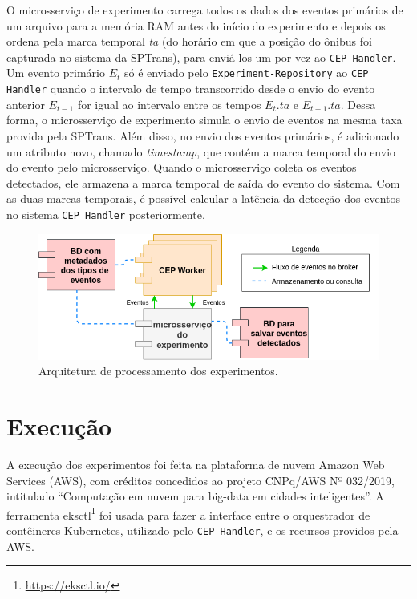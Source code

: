 O microsserviço de experimento carrega todos os dados dos eventos primários de um arquivo para a memória RAM antes do início do experimento e depois os ordena pela marca temporal \textit{ta} (do horário em que a posição do ônibus foi capturada no sistema da SPTrans), para enviá-los um por vez ao \texttt{CEP Handler}. Um evento primário $E_t$ só é enviado pelo \texttt{Experiment-Repository} ao \texttt{CEP Handler} quando o intervalo de tempo transcorrido desde o envio do evento anterior $E_{t-1}$ for igual ao intervalo entre os tempos $E_t.ta$ e $E_{t-1}.ta$. 
Dessa forma, o microsserviço de experimento simula o envio de eventos na mesma taxa provida pela SPTrans. 
Além disso, no envio dos eventos primários, é adicionado um atributo novo, chamado \textit{timestamp}, que contém a marca temporal do envio do evento pelo microsserviço. Quando o microsserviço coleta os eventos detectados, ele armazena a marca temporal de saída do evento do sistema. Com as duas marcas temporais, é possível calcular a latência da detecção dos eventos no sistema \texttt{CEP Handler} posteriormente.  



\begin{figure}[tb]
\centering
\includegraphics[width=\textwidth]{figuras/arquiteturaexp.png}
\caption{Arquitetura de processamento dos experimentos.}
\label{fig:experiment_arch_diagram}
\end{figure}

\section{Execução} 
A execução dos experimentos foi feita na plataforma de nuvem Amazon Web Services (AWS), com créditos concedidos ao projeto CNPq/AWS Nº 032/2019, intitulado ``Computação em nuvem para big-data em cidades inteligentes''.
A ferramenta eksctl\footnote{\url{https://eksctl.io/}} foi usada para fazer a interface entre o orquestrador de contêineres Kubernetes, utilizado pelo \texttt{CEP Handler}, e os recursos providos pela AWS.

